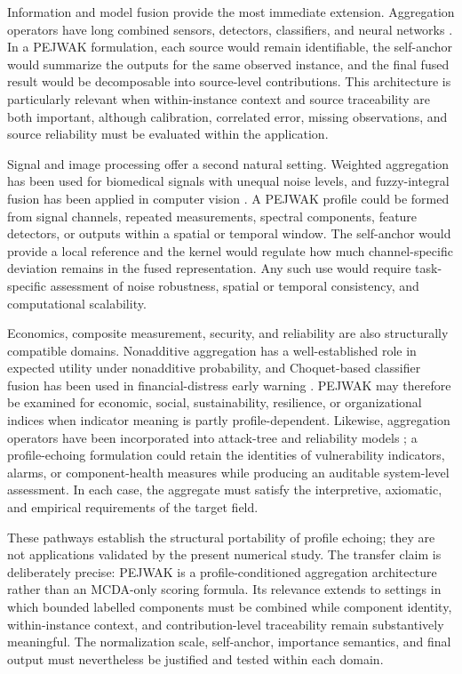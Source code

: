 \documentclass[reqno,11pt]{amsart}
\theoremstyle{definition}
\theoremstyle{plain}
\theoremstyle{remark}
\begin{document}
Information and model fusion provide the most immediate extension.
Aggregation operators have long combined sensors, detectors,
classifiers, and neural networks
\cite{Auephanwiriyakul2002,ChoKim1995}. In a PEJWAK formulation, each
source would remain identifiable, the self-anchor would summarize the
outputs for the same observed instance, and the final fused result would
be decomposable into source-level contributions. This architecture is
particularly relevant when within-instance context and source
traceability are both important, although calibration, correlated error,
missing observations, and source reliability must be evaluated within
the application.

Signal and image processing offer a second natural setting. Weighted
aggregation has been used for biomedical signals with unequal noise
levels, and fuzzy-integral fusion has been applied in computer vision
\cite{Bataillou1995,TahaniKeller1990}. A PEJWAK profile could be formed
from signal channels, repeated measurements, spectral components,
feature detectors, or outputs within a spatial or temporal window. The
self-anchor would provide a local reference and the kernel would regulate
how much channel-specific deviation remains in the fused representation.
Any such use would require task-specific assessment of noise robustness,
spatial or temporal consistency, and computational scalability.

Economics, composite measurement, security, and reliability are also
structurally compatible domains. Nonadditive aggregation has a
well-established role in expected utility under nonadditive probability,
and Choquet-based classifier fusion has been used in financial-distress
early warning \cite{Schmeidler1989,Cao2012}. PEJWAK may therefore be
examined for economic, social, sustainability, resilience, or
organizational indices when indicator meaning is partly profile-dependent.
Likewise, aggregation operators have been incorporated into attack-tree
and reliability models \cite{Yager2006}; a profile-echoing formulation
could retain the identities of vulnerability indicators, alarms, or
component-health measures while producing an auditable system-level
assessment. In each case, the aggregate must satisfy the interpretive,
axiomatic, and empirical requirements of the target field.

These pathways establish the structural portability of profile echoing;
they are not applications validated by the present numerical study. The
transfer claim is deliberately precise: PEJWAK is a
profile-conditioned aggregation architecture rather than an MCDA-only
scoring formula. Its relevance extends to settings in which bounded
labelled components must be combined while component identity,
within-instance context, and contribution-level traceability remain
substantively meaningful. The normalization scale, self-anchor,
importance semantics, and final output must nevertheless be justified and
tested within each domain.
\end{document}
